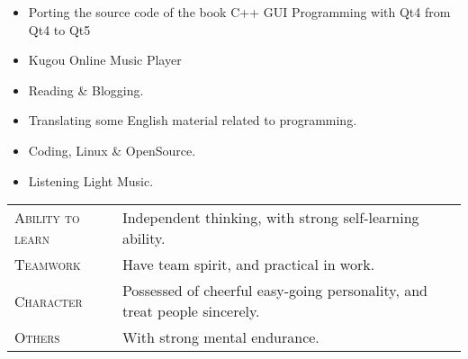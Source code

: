 \documentclass[a4paper, 10pt, titlepage]{article}
\begin{document}

\begin{itemize}
\item Porting the source code of the book C++ GUI Programming with Qt4 from Qt4 to Qt5

\item Kugou Online Music Player
\end{itemize}


\begin{itemize}
\item Reading \& Blogging.
\item Translating some English material related to programming.
\item Coding, Linux \& OpenSource.
\item Listening Light Music.
\end{itemize}



\begin{tabular}{ll}
 	\textsc{Ability to learn} & Independent thinking, with strong self-learning ability.\\
	\textsc{Teamwork} & Have team spirit, and practical in work.\\
	\textsc{Character} & Possessed of cheerful easy-going personality, and treat people sincerely.\\
	\textsc{Others} & With strong mental endurance.\\
\end{tabular}
\end{document}
